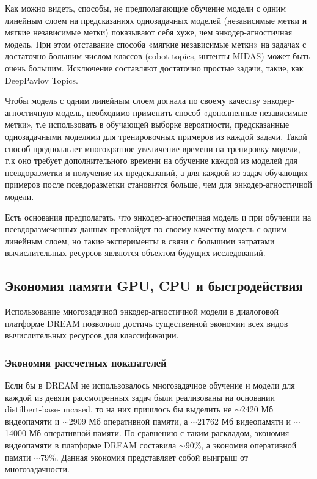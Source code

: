 Как можно видеть, способы, не предполагающие обучение модели с одним линейным слоем на предсказаниях однозадачных моделей (независимые метки и мягкие независимые метки) показывают себя хуже, чем энкодер-агностичная модель. При этом отставание способа «мягкие независимые метки» на задачах с достаточно большим числом классов (cobot topics, интенты MIDAS) может быть очень большим. Исключение составляют достаточно простые задачи, такие, как DeepPavlov Topics.

Чтобы модель с одним линейным слоем догнала по своему качеству энкодер-агностичную модель, необходимо применить способ «дополненные независимые метки», т.е использовать в обучающей выборке вероятности, предсказанные однозадачными моделями для тренировочных примеров из каждой задачи. Такой способ предполагает многократное увеличение времени на тренировку модели, т.к оно требует дополнительного времени на обучение каждой из моделей для псевдоразметки и получение их предсказаний, а для каждой из задач обучающих примеров после псевдоразметки становится больше, чем для энкодер-агностичной модели. 

Есть основания предполагать, что энкодер-агностичная модель и при обучении на псевдоразмеченных данных превзойдет по своему качеству модель с одним линейным слоем, но такие эксперименты в связи с большими затратами вычислительных ресурсов являются объектом будущих исследований.
\subsection{Экономия памяти GPU, CPU и быстродействия} 
\label{economy}
Использование многозадачной энкодер-агностичной модели в диалоговой платформе {DREAM} позволило достичь существенной экономии всех видов вычислительных ресурсов для классификации.
\subsubsection{Экономия рассчетных показателей} 
\label{economy_predicted} 
 Если бы в {DREAM} не использовалось многозадачное обучение и модели для каждой из девяти рассмотренных задач были реализованы на основании distilbert-base-uncased, то на них пришлось бы выделить не $\sim$2420 Мб видеопамяти и $\sim$2909 Мб оперативной памяти, а $\sim$21762 Мб видеопамяти и $\sim$14000 Мб оперативной памяти. По сравнению с таким раскладом, экономия видеопамяти в платформе {DREAM} составила $\sim$90\%, а экономия оперативной памяти $\sim$79\%. Данная экономия представляет собой выигрыш от многозадачности.


